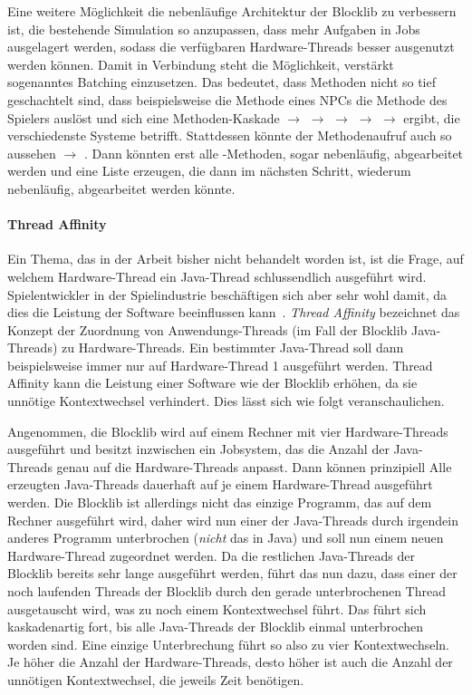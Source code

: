 \documentclass[12pt,a4paper,listof=toc,parskip=half,numbers=noenddot,abstract=true]{scrartcl}
\begin{document}
Eine weitere Möglichkeit die nebenläufige Architektur der Blocklib zu verbessern ist, die bestehende Simulation so anzupassen, dass mehr Aufgaben in Jobs ausgelagert werden, sodass die verfügbaren Hardware-Threads besser ausgenutzt werden können. Damit in Verbindung steht die Möglichkeit, verstärkt sogenanntes Batching einzusetzen. Das bedeutet, dass Methoden nicht so tief geschachtelt sind, dass beispielsweise die  Methode eines NPCs die  Methode des Spielers auslöst und sich eine Methoden-Kaskade  $\to$  $\to$  $\to$  $\to$  $\to$  ergibt, die verschiedenste Systeme betrifft. Stattdessen könnte der Methodenaufruf auch so aussehen  $\to$ . Dann könnten erst alle 
-Methoden, sogar nebenläufig, abgearbeitet werden und eine Liste erzeugen, die dann im nächsten Schritt, wiederum nebenläufig, abgearbeitet werden könnte. 

\paragraph{Thread Affinity}
Ein Thema, das in der Arbeit bisher nicht behandelt worden ist, ist die Frage, auf welchem Hardware-Thread ein Java-Thread schlussendlich ausgeführt wird. Spielentwickler in der Spielindustrie beschäftigen sich aber sehr wohl damit, da dies die Leistung der Software beeinflussen kann~\cite{Gyrling2015}. \emph{Thread Affinity} bezeichnet das Konzept der Zuordnung von Anwendungs-Threads (im Fall der Blocklib Java-Threads) zu Hardware-Threads. Ein bestimmter Java-Thread soll dann beispielsweise immer nur auf Hardware-Thread 1 ausgeführt werden. Thread Affinity kann die Leistung einer Software wie der Blocklib erhöhen, da sie unnötige Kontextwechsel verhindert. Dies lässt sich wie folgt veranschaulichen.

Angenommen, die Blocklib wird auf einem Rechner mit vier Hardware-Threads ausgeführt und besitzt inzwischen ein Jobsystem, das die Anzahl der Java-Threads genau auf die Hardware-Threads anpasst. Dann können prinzipiell Alle erzeugten Java-Threads dauerhaft auf je einem Hardware-Thread ausgeführt werden. Die Blocklib ist allerdings nicht das einzige Programm, das auf dem Rechner ausgeführt wird, daher wird nun einer der Java-Threads durch irgendein anderes Programm unterbrochen (\emph{nicht} das  in Java) und soll nun einem neuen Hardware-Thread zugeordnet werden. Da die restlichen Java-Threads der Blocklib bereits sehr lange ausgeführt werden, führt das nun dazu, dass einer der noch laufenden Threads der Blocklib durch den gerade unterbrochenen Thread ausgetauscht wird, was zu noch einem Kontextwechsel führt. Das führt sich kaskadenartig fort, bis alle Java-Threads der Blocklib einmal unterbrochen worden sind. Eine einzige Unterbrechung führt so also zu vier Kontextwechseln. Je höher die Anzahl der Hardware-Threads, desto höher ist auch die Anzahl der unnötigen Kontextwechsel, die jeweils Zeit benötigen.
\end{document}
